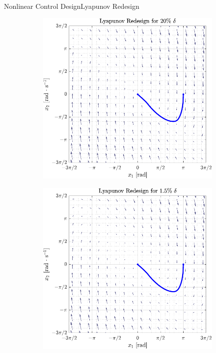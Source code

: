 \begin{frame}{Nonlinear Control Design}{Lyapunov Redesign}
  \begin{figure}[H]
    \begin{minipage}{0.45\linewidth}
      \begin{figure}[H]
        \centering
        \includegraphics[width=\linewidth]{figures/lyapunovRedesignPhasePlot}
      \end{figure}        
    \end{minipage}\hfill      
    \begin{minipage}{0.45\linewidth}
      \begin{figure}[H]
        \centering
        \includegraphics[width=1\linewidth]{figures/lyapunovRedesignPhasePlot2}

\end{figure}
\end{minipage}
\end{figure}
\end{frame}
